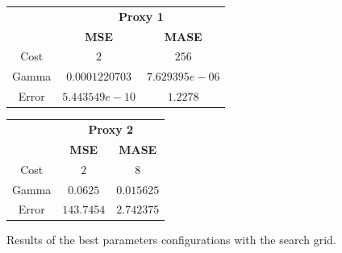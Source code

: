 \begin{figure}[!h]
\centering
\begin{minipage}{\textwidth}
\begin{minipage}{0.5\textwidth}
\begin{center}
\vskip10pt
   \begin{footnotesize}
   \begin{tabular}{|c|c|c|}
   \hline
   & \multicolumn{2}{|c|}{\textbf{Proxy 1}} \\ \cline{2-3}
   & \textbf{MSE} & \textbf{MASE}          \\ \hline
   Cost  & $2$            & $256$          \\ 
   Gamma & $0.0001220703$ & $7.629395e-06$ \\ 
   Error & $5.443549e-10$ & $1.2278$     \\ 
   \hline
   \end{tabular}
   \end{footnotesize}
\end{center}
\end{minipage}
\begin{minipage}{0.5\textwidth}
\begin{center}
\vskip12pt
   \begin{footnotesize}
   \begin{tabular}{|c|c|c|}
   \hline
   & \multicolumn{2}{|c|}{\textbf{Proxy 2}} \\ \cline{2-3}
   & \textbf{MSE} & \textbf{MASE}          \\ \hline
   Cost  & $2$      & $8$          \\ 
   Gamma & $0.0625$ & $0.015625$ \\ 
   Error & $143.7454$      & $2.742375$     \\ 
   \hline
   \end{tabular}
   \end{footnotesize}
\end{center}
\end{minipage}
\end{minipage}
\caption{Results of the best parameters configurations with the search grid.}
\label{fig:table6m}
\end{figure}
